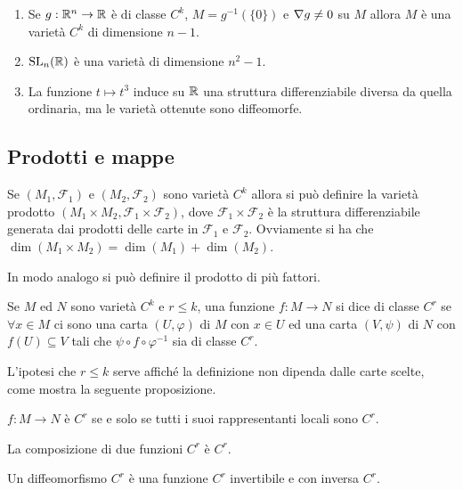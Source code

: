  \begin{exercise}
  \begin{enumerate}
   \item Se $g:\mathbb R^n\to\mathbb R$ è di classe $C^k$, $M=g^{-1}(\{0\})$ e $\nabla g\ne 0$
   su $M$ allora $M$ è una varietà $C^k$ di dimensione $n-1$.
   \item $\mathrm{SL}_n(\mathbb R)$ è una varietà di dimensione $n^2-1$.
   \item La funzione $t\mapsto t^3$ induce su $\mathbb R$ una struttura differenziabile diversa
   da quella ordinaria, ma le varietà ottenute sono diffeomorfe.
  \end{enumerate}
 \end{exercise}
 
 \subsection{Prodotti e mappe}
 
 Se $(M_1,\mathcal F_1)$ e $(M_2,\mathcal F_2)$ sono varietà $C^k$ allora si può definire la
 varietà prodotto $(M_1\times M_2,\mathcal F_1\times\mathcal F_2)$, dove $\mathcal F_1\times\mathcal F_2$
 è la struttura differenziabile generata dai prodotti delle carte in $\mathcal F_1$ e $\mathcal F_2$.
 Ovviamente si ha che $\dim(M_1\times M_2)=\dim(M_1)+\dim(M_2)$.
 
 In modo analogo si può definire il prodotto di più fattori.
 
 \begin{definition}
  Se $M$ ed $N$ sono varietà $C^k$ e $r\le k$, una funzione $f:M\to N$ si dice
  di classe $C^r$ se $\forall x\in M$ ci sono una carta $(U,\varphi)$ di $M$ con
  $x\in U$ ed una carta $(V,\psi)$ di $N$ con $f(U)\subseteq V$ tali che $\psi\circ f\circ\varphi^{-1}$
  sia di classe $C^r$.
 \end{definition}
 
 L'ipotesi che $r\le k$ serve affiché la definizione non dipenda dalle carte scelte, come
 mostra la seguente proposizione.
 
 \begin{proposition}
  $f:M\to N$ è $C^r$ se e solo se tutti i suoi rappresentanti locali sono $C^r$.
 \end{proposition}
 
 \begin{proposition}
   La composizione di due funzioni $C^r$ è $C^r$.
 \end{proposition}
 
 \begin{definition}
  Un diffeomorfismo $C^r$ è una funzione $C^r$ invertibile e con inversa $C^r$.
 \end{definition}
 
